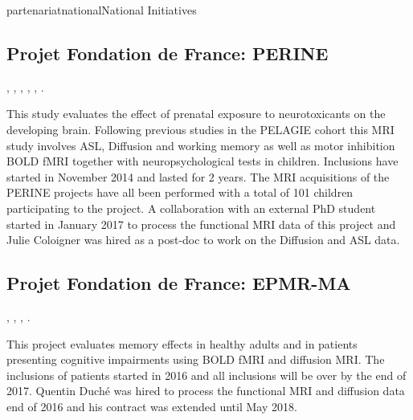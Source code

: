 \documentclass{ra2018}
\begin{document}
\begin{module}{partenariat}{national}{National Initiatives}

        \subsection{Projet Fondation de France: PERINE}
    \begin{participants}
      , 
      , 
      , 
      , 
      ,
      .
    \end{participants}
    This study evaluates the effect of prenatal exposure to neurotoxicants on the
    developing brain. Following previous studies in the PELAGIE cohort this MRI
    study involves ASL, Diffusion and working memory as well as motor inhibition
    BOLD fMRI together with neuropsychological tests in children. Inclusions have
    started in November 2014 and lasted for 2 years.  The MRI acquisitions of the
    PERINE projects have all been performed with a total of 101 children participating to the project. A collaboration with an external PhD student started in January 2017 to process the functional MRI data of this project and Julie Coloigner was hired as a post-doc to work on the Diffusion and ASL data.
    
    \subsection{Projet Fondation de France: EPMR-MA}
    \begin{participants}
      ,
      , 
      , 
      .
    \end{participants}
    This project evaluates memory effects in healthy adults and in patients
    presenting cognitive impairments using BOLD fMRI and diffusion MRI. 
    The inclusions of patients started in 2016 and all inclusions will be over by the end of 2017. Quentin Duché was hired to process the functional MRI and diffusion data end of 2016 and his contract was extended until May 2018. 



\end{module}
\end{document}

